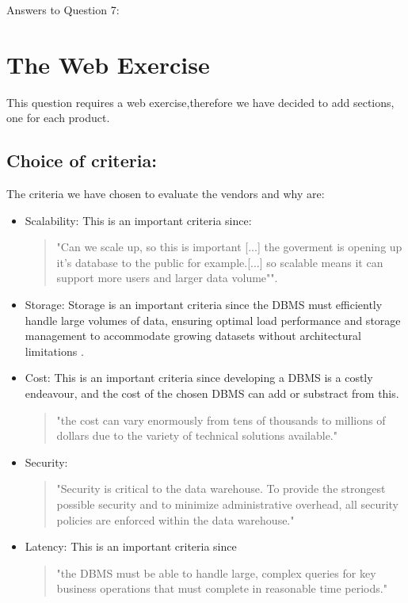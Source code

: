 \newpage Answers to Question 7:
\section{The Web Exercise}
This question requires a web exercise,therefore we have decided to add sections, one for each product. 

\subsection{Choice of criteria:}
The criteria we have chosen to evaluate the vendors and why are:
\begin{itemize}
    \item Scalability: This is an important criteria since:
    \begin{quotation}
        "Can we scale up, so this is important [...] the goverment is opening up it's database to the public for example.[...] so scalable means it can support more users and larger data volume"\cite{l1video}".
    \end{quotation}
    \item Storage: Storage is an important criteria since
    the DBMS must efficiently handle large volumes of data, 
    ensuring optimal load performance and storage management to 
    accommodate growing datasets without architectural limitations \cite[p. 1239]{CourseLitt}.
    \item Cost: This is an important criteria since developing a DBMS is a costly endeavour, and the cost of the chosen DBMS can add or substract from this. \begin{quotation}
        "the cost can vary enormously from tens of thousands to millions of dollars due to
    the variety of technical solutions available." \cite[p. 1226]{CourseLitt}
    \end{quotation}
    \item Security: \begin{quote}
        "Security is critical to the data warehouse. To provide the strongest possible
security and to minimize administrative overhead, all security policies are enforced
within the data warehouse."\cite[p. 1309]{CourseLitt}
    \end{quote}
    \item Latency: This is an important criteria since \begin{quotation}
         "the DBMS must be able to handle large, complex queries for key business operations that must complete in reasonable time periods." \cite[p. 1239]{CourseLitt}
    \end{quotation} 
\end{itemize}
